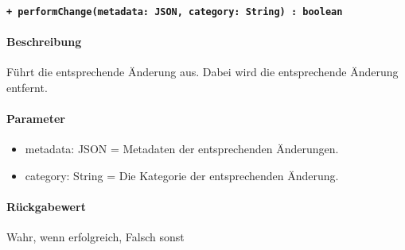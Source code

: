 \paragraph{\texttt{+ performChange(metadata: JSON, category: String) : boolean}}%
\paragraph*{Beschreibung}
Führt die entsprechende Änderung aus.
Dabei wird die entsprechende Änderung entfernt.
\paragraph*{Parameter}
\begin{itemize}
    \item metadata: JSON = Metadaten der entsprechenden Änderungen.
    \item category: String = Die Kategorie der entsprechenden Änderung.
\end{itemize}
\paragraph*{Rückgabewert}
Wahr, wenn erfolgreich, Falsch sonst
